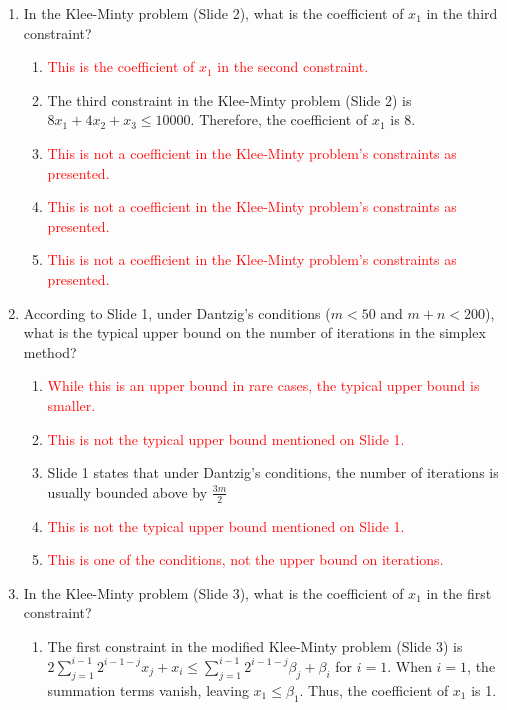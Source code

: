 \documentclass{article}%
\newcommand{\incorrect}[1]{\textcolor{red}{#1}}
\begin{document}
\begin{enumerate}
\begin{enumerate}
\begin{enumerate}
\end{enumerate}%
\vspace{0.5em}%
\end{enumerate}%
\item In the Klee-Minty problem (Slide 2), what is the coefficient of $x_1$ in the third constraint?%
\begin{enumerate}%
\item \incorrect{This is the coefficient of $x_1$ in the second constraint.}%
\item The third constraint in the Klee-Minty problem (Slide 2) is $8x_1 + 4x_2 + x_3 \le 10000$. Therefore, the coefficient of $x_1$ is 8.%
\item \incorrect{This is not a coefficient in the Klee-Minty problem's constraints as presented.}%
\item \incorrect{This is not a coefficient in the Klee-Minty problem's constraints as presented.}%
\item \incorrect{This is not a coefficient in the Klee-Minty problem's constraints as presented.}%
\end{enumerate}%
\vspace{1em}%
\item According to Slide 1, under Dantzig's conditions ($m < 50$ and $m + n < 200$), what is the typical upper bound on the number of iterations in the simplex method?%
\begin{enumerate}%
\item \incorrect{While this is an upper bound in rare cases, the typical upper bound is smaller.}%
\item \incorrect{This is not the typical upper bound mentioned on Slide 1.}%
\item Slide 1 states that under Dantzig's conditions, the number of iterations is usually bounded above by $\frac{3m}{2}$%
\item \incorrect{This is not the typical upper bound mentioned on Slide 1.}%
\item \incorrect{This is one of the conditions, not the upper bound on iterations.}%
\end{enumerate}%
\vspace{1em}%
\item In the Klee-Minty problem (Slide 3), what is the coefficient of $x_1$ in the first constraint?%
\begin{enumerate}%
\item The first constraint in the modified Klee-Minty problem (Slide 3) is $2 \sum_{j=1}^{i-1} 2^{i-1-j} x_j + x_i \le \sum_{j=1}^{i-1} 2^{i-1-j} \beta_j + \beta_i$ for $i=1$.  When $i=1$, the summation terms vanish, leaving $x_1 \le \beta_1$. Thus, the coefficient of $x_1$ is 1.%

\end{enumerate}
\end{enumerate}
\end{document}
